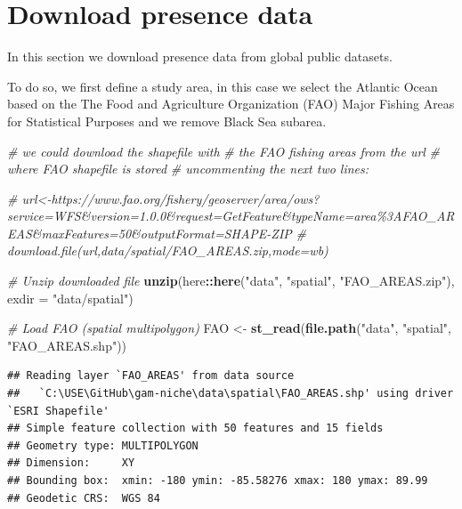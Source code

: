 \documentclass[
]{book}
\newenvironment{Shaded}{\begin{snugshade}}{\end{snugshade}}
\newcommand{\AttributeTok}[1]{\textcolor[rgb]{0.13,0.29,0.53}{#1}}
\newcommand{\CommentTok}[1]{\textcolor[rgb]{0.56,0.35,0.01}{\textit{#1}}}
\newcommand{\FunctionTok}[1]{\textcolor[rgb]{0.13,0.29,0.53}{\textbf{#1}}}
\newcommand{\NormalTok}[1]{#1}
\newcommand{\OtherTok}[1]{\textcolor[rgb]{0.56,0.35,0.01}{#1}}
\newcommand{\SpecialCharTok}[1]{\textcolor[rgb]{0.81,0.36,0.00}{\textbf{#1}}}
\newcommand{\StringTok}[1]{\textcolor[rgb]{0.31,0.60,0.02}{#1}}
\begin{document}
\section{Download presence data}\label{download-presence-data}

In this section we download presence data from global public datasets.

To do so, we first define a study area, in this case we select the Atlantic Ocean based on the The Food and Agriculture Organization (FAO) Major Fishing Areas for Statistical Purposes and we remove Black Sea subarea.

\begin{Shaded}
\begin{Highlighting}[]
\CommentTok{\# we could download the shapefile with}
\CommentTok{\# the FAO fishing areas from the url}
\CommentTok{\# where FAO shapefile is stored}
\CommentTok{\# uncommenting the next two lines:}

\CommentTok{\# url\textless{}{-}\textquotesingle{}https://www.fao.org/fishery/geoserver/area/ows?service=WFS\&version=1.0.0\&request=GetFeature\&typeName=area\%3AFAO\_AREAS\&maxFeatures=50\&outputFormat=SHAPE{-}ZIP\textquotesingle{}}
\CommentTok{\# download.file(url,\textquotesingle{}data/spatial/FAO\_AREAS.zip\textquotesingle{},mode=\textquotesingle{}wb\textquotesingle{})}

\CommentTok{\# Unzip downloaded file}
\FunctionTok{unzip}\NormalTok{(here}\SpecialCharTok{::}\FunctionTok{here}\NormalTok{(}\StringTok{"data"}\NormalTok{, }\StringTok{"spatial"}\NormalTok{, }\StringTok{"FAO\_AREAS.zip"}\NormalTok{),}
    \AttributeTok{exdir =} \StringTok{"data/spatial"}\NormalTok{)}

\CommentTok{\# Load FAO (spatial multipolygon)}
\NormalTok{FAO }\OtherTok{\textless{}{-}} \FunctionTok{st\_read}\NormalTok{(}\FunctionTok{file.path}\NormalTok{(}\StringTok{"data"}\NormalTok{, }\StringTok{"spatial"}\NormalTok{,}
    \StringTok{"FAO\_AREAS.shp"}\NormalTok{))}
\end{Highlighting}
\end{Shaded}

\begin{verbatim}
## Reading layer `FAO_AREAS' from data source 
##   `C:\USE\GitHub\gam-niche\data\spatial\FAO_AREAS.shp' using driver `ESRI Shapefile'
## Simple feature collection with 50 features and 15 fields
## Geometry type: MULTIPOLYGON
## Dimension:     XY
## Bounding box:  xmin: -180 ymin: -85.58276 xmax: 180 ymax: 89.99
## Geodetic CRS:  WGS 84
\end{verbatim}
\end{document}
